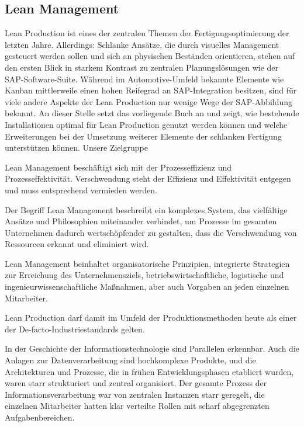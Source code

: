  \cite{Huber.2016}
 
 \cite{Wagner.2018}

\subsection{Lean Management}
Lean Production ist eines der zentralen Themen der Fertigungsoptimierung der letzten Jahre. Allerdings: Schlanke Ansätze, die durch visuelles Management gesteuert werden sollen und sich an physischen Beständen orientieren, stehen auf den ersten Blick in starkem Kontrast zu zentralen Planungslösungen wie der SAP-Software-Suite. Während im Automotive-Umfeld bekannte Elemente wie Kanban mittlerweile einen hohen Reifegrad an SAP-Integration besitzen, sind für viele andere Aspekte der Lean Production nur wenige Wege der SAP-Abbildung bekannt. An dieser Stelle setzt das vorliegende Buch an und zeigt, wie bestehende Installationen optimal für Lean Production genutzt werden können und welche Erweiterungen bei der Umsetzung weiterer Elemente der schlanken Fertigung unterstützen können. Unsere Zielgruppe

Lean Management beschäftigt sich mit der Prozesseffizienz und Prozesseffektivität. Verschwendung steht der Effizienz und Effektivität entgegen und muss entsprechend vermieden werden.

Der Begriff Lean Management beschreibt ein komplexes System, das vielfältige Ansätze und Philosophien miteinander verbindet, um Prozesse im gesamten Unternehmen dadurch wertschöpfender zu gestalten, dass die Verschwendung von Ressourcen erkannt und eliminiert wird.

Lean Management beinhaltet organisatorische Prinzipien, integrierte Strategien zur Erreichung des Unternehmensziels, betriebswirtschaftliche, logistische und ingenieurwissenschaftliche Maßnahmen, aber auch Vorgaben an jeden einzelnen Mitarbeiter.

Lean Production darf damit im Umfeld der Produktionsmethoden heute als
einer der De-facto-Industriestandards gelten.

In der Geschichte der Informationstechnologie sind Parallelen erkennbar. Auch die Anlagen zur Datenverarbeitung sind hochkomplexe Produkte, und die Architekturen und Prozesse, die in frühen Entwicklungsphasen etabliert wurden, waren starr strukturiert und zentral organisiert. Der gesamte Prozess der Informationsverarbeitung war von zentralen Instanzen starr geregelt, die einzelnen Mitarbeiter hatten klar verteilte Rollen mit scharf abgegrenzten Aufgabenbereichen.

